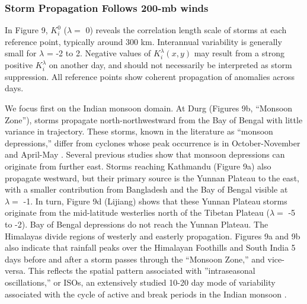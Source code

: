 \documentclass[12pt]{article}
\begin{document}
\subsubsection{Storm Propagation Follows 200-mb winds}	
		 	 		
	 In Figure 9, $K_i^0$ ($\lambda =$ 0) reveals the correlation length scale of storms at each reference point, typically around 300 km. Interannual variability is generally small for $\lambda$ = -2 to 2. Negative values of $K_i^\lambda(x,y)$ may result from a strong positive $K_i^{\lambda}$  on another day, and should not necessarily be interpreted as storm suppression. All reference points show coherent propagation of anomalies across days. 
	 
	 We focus first on the Indian monsoon domain. At Durg (Figures 9b, ``Monsoon Zone''), storms propagate north-northwestward from the Bay of Bengal with little variance in trajectory. These storms, known in the literature as ``monsoon depressions,'' differ from cyclones whose peak occurrence is in October-November and April-May \citep{Li2013}. Several previous studies show that monsoon depressions can originate from further east\citep{Saha1981,Fujinami2011}. Storms reaching Kathmandu (Figure 9a) also propagate westward, but their primary source is the Yunnan Plateau to the east, with a smaller contribution from Bangladesh and the Bay of Bengal visible at $\lambda =$ -1. In turn, Figure 9d (Lijiang) shows that these Yunnan Plateau storms originate from the mid-latitude westerlies north of the Tibetan Plateau ($\lambda =$ -5 to -2). Bay of Bengal depressions do not reach the Yunnan Plateau. The Himalayas divide regions of westerly and easterly propagation. Figures 9a and 9b also indicate that rainfall peaks over the Himalayan Foothills and South India 5 days before and after a storm passes through the ``Monsoon Zone,'' and vice-versa. This reflects the spatial pattern associated with ''intraseasonal oscillations,'' or ISOs, an extensively studied 10-20 day mode of variability associated with the cycle of active and break periods in the Indian monsoon \citep{Krishnamurti1980,Chen1993,Annamalai2001,Han2006,Fujinami2014}.
	 	 
\end{document}
